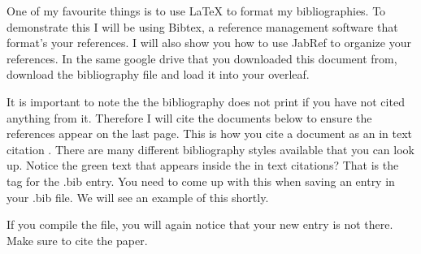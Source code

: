 \documentclass[paper=a4, fontsize=11pt]{scrartcl}
\numberwithin{equation}{section}		%
\numberwithin{table}{section}				%
\begin{document}
One of my favourite things is to use \LaTeX{} to format my bibliographies. To demonstrate this I will be using Bibtex, a reference management software that format's your references. I will also show you how to use JabRef to organize your references. In the same google drive that you downloaded this document from, download the bibliography file and load it into your overleaf. 


It is important to note the the bibliography does not print if you have not cited anything from it. Therefore I will cite the documents below to ensure the references appear on the last page. This is how you cite a document as an in text citation \cite{LuTao2021Daco}. There are many different bibliography styles available that you can look up. Notice the green text that appears inside the in text citations? That is the tag for the .bib entry. You need to come up with this when saving an entry in your .bib file. We will see an example of this shortly. 


If you compile the file, you will again notice that your new entry is not there. Make sure to cite the paper. 

 
\clearpage
 




\end{document}
